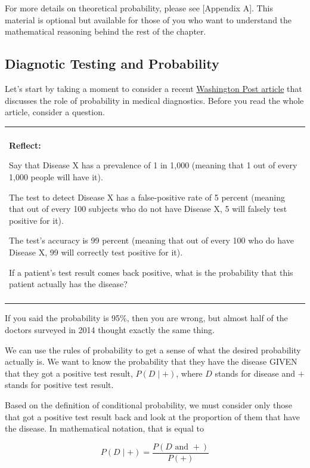 \documentclass[
]{book}
\newenvironment{reflect}
{
    \begin{center}
    
    \begin{tabular}{|p{0.8\textwidth}|}
    \rowcolor{LightBlue}
    \hline\\
    \rowcolor{LightBlue}
    \textbf{Reflect:}
}
{
    \\\rowcolor{LightBlue}
    \\\hline
    \end{tabular} 
    \end{center}
}
\begin{document}
For more details on theoretical probability, please see {[}Appendix A{]}. This material is optional but available for those of you who want to understand the mathematical reasoning behind the rest of the chapter.

\hypertarget{diagnotic-testing-and-probability}{%
\subsection{Diagnotic Testing and Probability}\label{diagnotic-testing-and-probability}}

Let's start by taking a moment to consider a recent \href{https://www.washingtonpost.com/news/posteverything/wp/2018/10/05/feature/doctors-are-surprisingly-bad-at-reading-lab-results-its-putting-us-all-at-risk/?utm_term=.73d08eefca3c}{Washington Post article} that discusses the role of probability in medical diagnostics. Before you read the whole article, consider a question.

\begin{reflect}
Say that Disease X has a prevalence of 1 in 1,000 (meaning that 1 out of
every 1,000 people will have it).

The test to detect Disease X has a false-positive rate of 5 percent
(meaning that out of every 100 subjects who do not have Disease X, 5
will falsely test positive for it).

The test's accuracy is 99 percent (meaning that out of every 100 who do
have Disease X, 99 will correctly test positive for it).

If a patient's test result comes back positive, what is the probability
that this patient actually has the disease?
\end{reflect}

If you said the probability is 95\%, then you are wrong, but almost half of the doctors surveyed in 2014 thought exactly the same thing.

We can use the rules of probability to get a sense of what the desired probability actually is. We want to know the probability that they have the disease GIVEN that they got a positive test result, \(P(D \mid +)\), where \(D\) stands for disease and \(+\) stands for positive test result.

Based on the definition of conditional probability, we must consider only those that got a positive test result back and look at the proportion of them that have the disease. In mathematical notation, that is equal to

\[P(D \mid +) = \frac{P(D \text{ and } +)}{P(+)}\]
\end{document}
